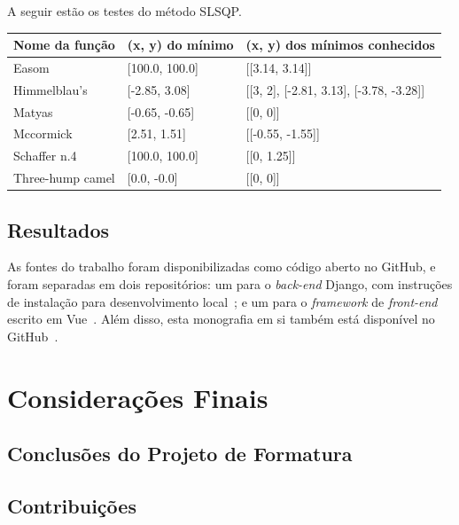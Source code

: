 \documentclass[]{politex}
\begin{document}
A seguir estão os testes do método SLSQP.
\begin{table}[H]
\begin{tabular}{l|l|l}
 Nome da função & (x, y) do mínimo & (x, y) dos mínimos conhecidos \\ \hline
 \rowcolor{Gray}
 Easom & [100.0, 100.0] & [[3.14, 3.14]] \\
 \rowcolor{Gray}
 Himmelblau's & [-2.85, 3.08] & [[3, 2], [-2.81, 3.13], [-3.78, -3.28]] \\
 \rowcolor{Gray}
 Matyas & [-0.65, -0.65] & [[0, 0]] \\
 \rowcolor{Gray}
 Mccormick & [2.51, 1.51] & [[-0.55, -1.55]] \\
 \rowcolor{Gray}
 Schaffer n.4 & [100.0, 100.0] & [[0, 1.25]] \\
 Three-hump camel & [0.0, -0.0] & [[0, 0]]
\end{tabular}
\end{table}



\section{Resultados}


As fontes do trabalho foram disponibilizadas como código aberto no GitHub, e
foram separadas em dois repositórios: um para o \textit{back-end} Django, com
instruções de instalação para desenvolvimento local~\cite{repo-django}; e um
para o \textit{framework} de \textit{front-end} escrito em Vue~\cite{repo-vue}.
Além disso, esta monografia em si também está disponível no GitHub~\cite{repo-tcc}.

\chapter{Considerações Finais}


\section{Conclusões do Projeto de Formatura}


\section{Contribuições}
\end{document}
